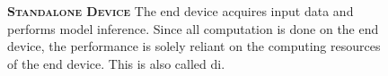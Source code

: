 \begin{figure}
	\begin{minipage}{0.65\linewidth}
		\textbf{\protect{} \textsc{Standalone Device}}
		\color{caption-color} \newline
		The end device acquires input data and performs model inference. Since all computation is done on the end device, the performance is solely reliant on the computing resources of the end device. This is also called \acrlong{di}.
	\end{minipage}%
	\hfill
	\begin{minipage}{0.3\linewidth}
		\centering
		\captionsetup[subfigure]{justification=centering}
		\begin{figure}
			\centering
		\end{figure}
	\end{minipage}
	

\end{figure}
